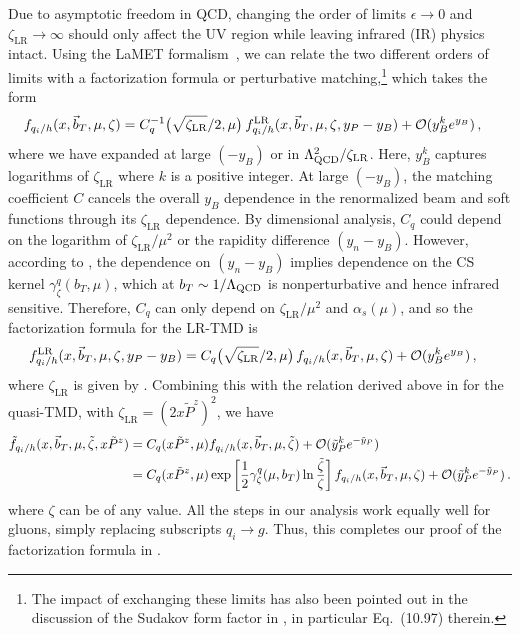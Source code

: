 \documentclass[11pt,a4paper]{article}
\newcommand{\eps}{\epsilon}
\newcommand{\nn}{\nonumber}
\newcommand{\q}{q_i}
\newcommand{\LR}{\mathrm{LR}}
\begin{document}
Due to asymptotic freedom in QCD, changing the order of limits $\eps\to0$ and $\zeta_\LR\to\infty$ should only affect the UV region while leaving infrared (IR) physics intact.
Using the LaMET formalism~\cite{Ji:2013dva,Ji:2014gla,Ji:2020ect}, we can relate the two different orders of limits with a factorization formula or perturbative matching,\footnote{The impact of exchanging these limits has also been pointed out in the discussion of the Sudakov form factor in , in particular Eq.~(10.97) therein.} which takes the form
\begin{align}
	f_{\q/h} (x,\vec{b}_T,\mu,\zeta) 
   &= C_q^{-1}\big(\sqrt{\zeta_\LR}/2, \mu\big) \:
    f^\LR_{\q/h} (x,\vec{b}_T,\mu,\zeta,y_{P}-y_B)
	+ {\cal O}(y_B^k e^{y_B})
	\,,
\end{align}
where we have expanded at large $(-y_B)$ or in $\Lambda_{\rm QCD}^2/\zeta_\LR$. Here,  $y_B^k$ captures logarithms of $\zeta_\LR$ where $k$ is a positive integer. At large $(-y_B)$, the matching coefficient $C$ cancels the overall $y_B$ dependence in the renormalized beam and soft functions through its $\zeta_\LR$ dependence.
By dimensional analysis, $C_q$ could depend on the logarithm of $\zeta_\LR/\mu^2$ or the rapidity difference $(y_n-y_B)$.
However, according to , the dependence on $(y_n-y_B)$ implies dependence on the CS kernel $\gamma_{\zeta}^q(b_T,\mu)$, which at $b_T\sim 1/\Lambda_{\rm QCD}$ is nonperturbative and hence infrared sensitive.
Therefore, $C_q$ can only depend on $\zeta_\LR/\mu^2$ and $\alpha_s(\mu)$, and so the factorization formula for the LR-TMD is
\begin{align}\label{eq:fact}
	f^\LR_{\q/h} (x,\vec{b}_T,\mu,\zeta,y_{P}-y_B) 
   &= C_q\big(\sqrt{\zeta_\LR}/2, \mu\big) \,
    f_{\q/h} (x,\vec{b}_T,\mu,\zeta) + {\cal O}(y_B^k e^{y_B})
	\,,
\end{align}
where $\zeta_\LR$ is given by . 
Combining this with the relation derived above in  for the quasi-TMD, with $\zeta_\LR= (2x \tilde P^z)^2 $, we have
\begin{align}\label{eq:fact0}
	\tilde f_{\q/h} (x,\vec{b}_T,\mu,\tilde \zeta,x \tilde P^z) &=C_q(x\tilde P^z, \mu) f_{\q/h} (x,\vec{b}_T,\mu,\tilde \zeta) + {\cal O}(\tilde y_{P}^k e^{-\tilde y_{P}})  \\
	&=C_q(x\tilde P^z, \mu)\exp\left[ \frac12 \gamma_\zeta^q(\mu, b_T) \ln\frac{\tilde\zeta }{\zeta}\right] f_{\q/h} (x,\vec{b}_T,\mu, \zeta) + {\cal O}(\tilde y_{P}^k e^{-\tilde y_{P}})
\,.\nn\end{align}
where $\zeta$ can be of any value. All the steps in our analysis work equally well for gluons, simply replacing subscripts $\q\to g$. Thus, this completes our proof of the factorization formula in .
\end{document}
